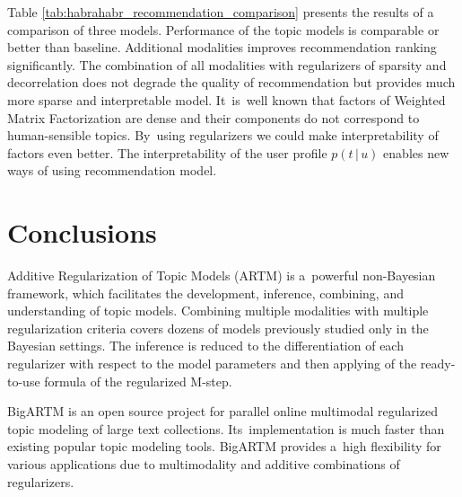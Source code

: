 \documentclass{acm_proc_article-sp}
\newcommand{\cond}{\mspace{3mu}{|}\mspace{3mu}}
\begin{document}
Table \ref{tab:habrahabr_recommendation_comparison} presents the results of a comparison of three models.
Performance of the topic models is comparable or better than baseline.
Additional modalities improves recommendation ranking significantly.
The combination of all modalities with regularizers of sparsity and decorrelation
does not degrade the quality of recommendation but provides much more sparse and interpretable model.
It~is~well known that factors of Weighted Matrix Factorization are dense and their components do not correspond to human-sensible topics.
By~using regularizers we could make interpretability of factors even better.
The interpretability of the user profile $p(t\cond u)$ enables new ways of using recommendation model.


%


\section{Conclusions}
\label{sec:Conclusions}
Additive Regularization of Topic Models (ARTM)
is a~powerful non-Bayesian framework,
which facilitates the development, inference, combining, and understanding of topic models.
Combining multiple modalities with multiple regularization criteria
covers dozens of models previously studied only in the Bayesian settings.
The inference is reduced to 
the differentiation of each regularizer with respect to the model parameters and 
then applying of the ready-to-use formula of the regularized \mbox{M-step}.

\mbox{BigARTM} is an open source project 
for parallel online multimodal regularized topic modeling of large text collections.
Its~implementation is much faster than existing popular topic modeling tools.
\mbox{BigARTM} provides a~high flexibility for various applications due to
multimodality and additive combinations of regularizers.
\end{document}
